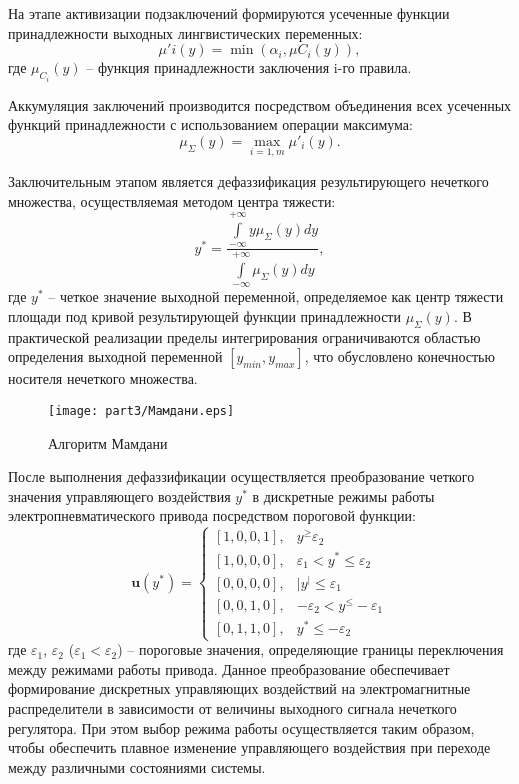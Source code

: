 На этапе активизации подзаключений формируются усеченные
функции принадлежности выходных лингвистических переменных:
\begin{equation}
	\mu'i(y) = \min(\alpha_i, \mu{C_i}(y)),
\end{equation}
где $\mu_{C_i}(y)$ -- функция принадлежности заключения i-го правила.

Аккумуляция заключений производится посредством объединения всех
усеченных функций принадлежности с использованием операции максимума:
\begin{equation}
	\mu_\Sigma(y) = \max_{i=1,m}\mu'_i(y).
\end{equation}

Заключительным этапом является дефаззификация результирующего
нечеткого множества, осуществляемая методом центра тяжести:
\begin{equation}
	y^* = \frac{\displaystyle\int\limits_{-\infty}^{+\infty} y\mu_\Sigma(y)dy}{\displaystyle\int\limits_{-\infty}^{+\infty} \mu_\Sigma(y)dy},
\end{equation}
где $y^*$ -- четкое значение выходной переменной, определяемое как центр тяжести площади под кривой
результирующей функции принадлежности $\mu_\Sigma(y)$.
В практической реализации пределы интегрирования ограничиваются областью определения
выходной переменной $[y_{min}, y_{max}]$, что обусловлено конечностью носителя нечеткого множества.

\begin{figure}[ht]
	\centering
	\texttt{[image: part3/Мамдани.eps]}
	\caption{Алгоритм Мамдани}
	\label{fig:fuzzy_inference}
\end{figure}

После выполнения дефаззификации осуществляется преобразование четкого значения управляющего воздействия
$y^*$ в дискретные режимы работы электропневматического привода посредством пороговой функции:
\begin{equation}
	\mathbf{u}(y^*) = \begin{cases}
		[1,0,0,1], & y^ \geq \varepsilon_2                   \\
		[1,0,0,0], & \varepsilon_1 < y^* \leq \varepsilon_2  \\
		[0,0,0,0], & |y^| \leq \varepsilon_1                 \\
		[0,0,1,0], & -\varepsilon_2 < y^ \leq -\varepsilon_1 \\
		[0,1,1,0], & y^* \leq -\varepsilon_2
	\end{cases}
\end{equation}
где $\varepsilon_1$, $\varepsilon_2$ ($\varepsilon_1 < \varepsilon_2$) -- пороговые значения, определяющие
границы переключения между режимами работы привода.
Данное преобразование обеспечивает формирование дискретных
управляющих воздействий на электромагнитные распределители в зависимости от
величины выходного сигнала нечеткого регулятора. При этом выбор
режима работы осуществляется таким образом, чтобы обеспечить плавное
изменение управляющего воздействия при переходе между различными состояниями системы.


